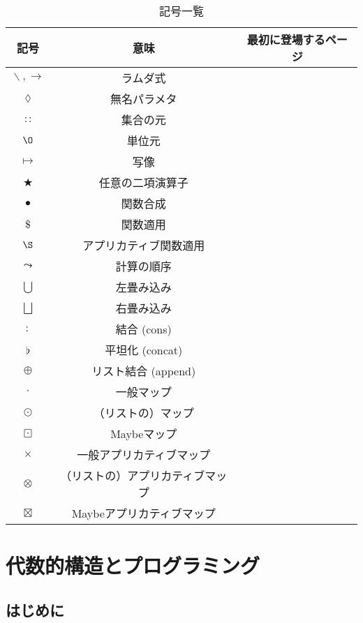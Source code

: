 \documentclass[a5paper,draft]{jsbook}
\newcommand{\mathId}{\O}
\newcommand{\mathAnonymousParameter}{\lozenge}
\newcommand{\mathUnaryOperator}[1]{\operatorname{#1}}
\newcommand{\mathLambda}{\mathUnaryOperator{\backslash}}
\DeclareMathOperator{\mathConcat}{\flat}%
\DeclareMathOperator*{\mathFold}{\bigcup}
\DeclareMathOperator*{\mathFoldRight}{\bigsqcup}
\newcommand{\mathBinaryOperator}[1]{\operatorname{#1}}
\newcommand{\mathAnyBinaryOperator}{\mathBinaryOperator{\bigstar}}
\newcommand{\mathAppend}{\oplus}
\newcommand{\mathApplicativeApply}{\mathBinaryOperator{\S}}
\newcommand{\mathApplicativeGeneralMap}{\times}
\newcommand{\mathApplicativeMap}{\otimes}
\newcommand{\mathApplicativeMaybeMap}{\boxtimes}
\newcommand{\mathApply}{\mathBinaryOperator{\$}}
\newcommand{\mathCompose}{\mathBinaryOperator{\bullet}}
\newcommand{\mathGeneralMap}{\mathBinaryOperator{\cdot}}
\newcommand{\mathIn}{\mathBinaryOperator{:\!:}}
\newcommand{\mathMap}{\mathBinaryOperator{\odot}}
\newcommand{\mathMaybeAppend}{\mathBinaryOperator{\boxplus}}
\newcommand{\mathMaybeMap}{\mathBinaryOperator{\boxdot}}
\newcommand{\mathLambdaArrow}{\rightarrow}
\newcommand{\mathMapsTo}{\mapsto}
\begin{document}
\begin{table*}[p]
\caption{記号一覧}
\begin{center}
\begin{tabular}{||c|c|c||}
\hline
記号&意味&最初に登場するページ\\
\hline\hline
$\mathLambda,\mathLambdaArrow$&ラムダ式&\\
$\mathAnonymousParameter$&無名パラメタ&\\\hline
$\mathIn$&集合の元&\\
$\mathId$&単位元&\\
$\mathMapsTo$&写像&\\
$\mathAnyBinaryOperator$&任意の二項演算子&\\\hline
$\mathCompose$&関数合成&\\
$\mathApply$&関数適用&\\
$\mathApplicativeApply$&アプリカティブ関数適用&\\
$\leadsto$&計算の順序&\\\hline
$\mathFold$&左畳み込み&\\
$\mathFoldRight$&右畳み込み&\\\hline
$:$&結合 (cons)&\\
$\mathConcat$&平坦化 (concat)&\\
$\mathAppend$&リスト結合 (append)&\\
\hline
$\mathGeneralMap$&一般マップ&\\
$\mathMap$&（リストの）マップ&\\
$\mathMaybeMap$&Maybeマップ&\\\hline
$\mathApplicativeGeneralMap$&一般アプリカティブマップ&\\
$\mathApplicativeMap$&（リストの）アプリカティブマップ&\\
$\mathApplicativeMaybeMap$&Maybeアプリカティブマップ&\\
\hline
\end{tabular}
\end{center}
\end{table*}

\part{代数的構造とプログラミング}

\chapter{はじめに}
\end{document}
